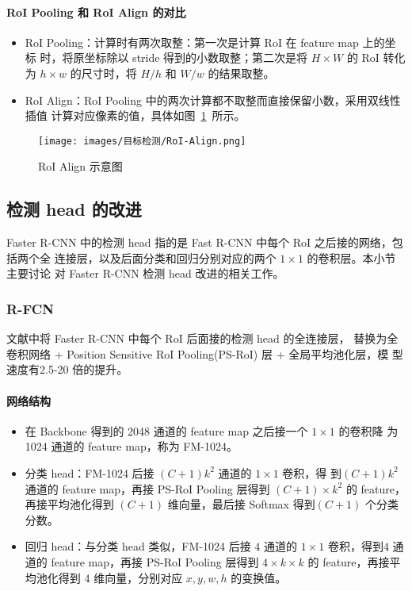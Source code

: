 \paragraph{RoI Pooling 和 RoI Align 的对比}

\begin{itemize}
  \item RoI Pooling：计算时有两次取整：第一次是计算 RoI 在 feature map 上的坐标
    时，将原坐标除以 stride 得到的小数取整；第二次是将 $H \times W$ 的 RoI 转化为 $h
    \times w$ 的尺寸时，将 $H/h$ 和 $W/w$ 的结果取整。
  \item RoI Align：RoI Pooling 中的两次计算都不取整而直接保留小数，采用双线性插值
    计算对应像素的值，具体如图~\ref{fig:roi-align}~所示。
\end{itemize}

\begin{figure}[ht]
  \centering
  \texttt{[image: images/目标检测/RoI-Align.png]}
  \caption{RoI Align 示意图}
  \label{fig:roi-align}
\end{figure}

\subsection{检测 head 的改进}
Faster R-CNN 中的检测 head 指的是 Fast R-CNN 中每个 RoI 之后接的网络，包括两个全
连接层，以及后面分类和回归分别对应的两个 $1 \times 1$ 的卷积层。本小节主要讨论
对 Faster R-CNN 检测 head 改进的相关工作。

\subsubsection{R-FCN}
文献中将 Faster R-CNN 中每个 RoI 后面接的检测 head 的全连接层，
替换为全卷积网络 + Position Sensitive RoI Pooling(PS-RoI) 层 + 全局平均池化层，模
型速度有2.5-20 倍的提升。

\paragraph{网络结构}

\begin{itemize}
  \item 在 Backbone 得到的 2048 通道的 feature map 之后接一个 $1 \times 1$ 的卷积降
    为 1024 通道的 feature map，称为 FM-1024。
  \item 分类 head：FM-1024 后接 $(C+1)k^2$ 通道的 $1 \times 1$ 卷积，得
    到$(C+1)k^2$ 通道的 feature map，再接 PS-RoI Pooling 层得到 $(C+1) \times
    k^2$ 的 feature，再接平均池化得到 $(C+1)$ 维向量，最后接 Softmax 得到$(C+1)$
    个分类分数。
  \item 回归 head：与分类 head 类似，FM-1024 后接 $4$ 通道的 $1 \times 1$
    卷积，得到$4$ 通道的 feature map，再接 PS-RoI Pooling 层得到 $4
    \times k \times k$ 的 feature，再接平均池化得到 $4$ 维向量，分别对应 $x, y,
    w, h$ 的变换值。
\end{itemize}

